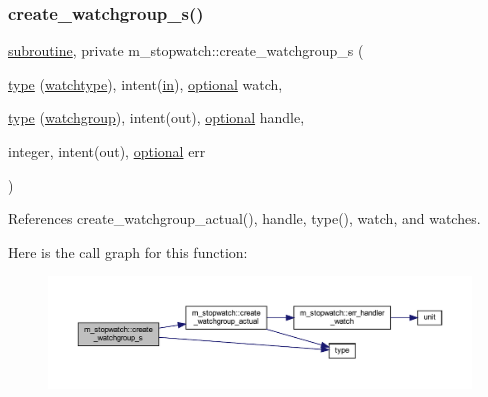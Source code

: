 \subsubsection{\texorpdfstring{create\+\_\+watchgroup\+\_\+s()}{create\_watchgroup\_s()}}
{\footnotesize\ttfamily \hyperlink{M__stopwatch_83_8txt_acfbcff50169d691ff02d4a123ed70482}{subroutine}, private m\+\_\+stopwatch\+::create\+\_\+watchgroup\+\_\+s (\begin{DoxyParamCaption}\item[{\hyperlink{stop__watch_83_8txt_a70f0ead91c32e25323c03265aa302c1c}{type} (\hyperlink{structm__stopwatch_1_1watchtype}{watchtype}), intent(\hyperlink{M__journal_83_8txt_afce72651d1eed785a2132bee863b2f38}{in}), \hyperlink{option__stopwatch_83_8txt_aa4ece75e7acf58a4843f70fe18c3ade5}{optional}}]{watch,  }\item[{\hyperlink{stop__watch_83_8txt_a70f0ead91c32e25323c03265aa302c1c}{type} (\hyperlink{structm__stopwatch_1_1watchgroup}{watchgroup}), intent(out), \hyperlink{option__stopwatch_83_8txt_aa4ece75e7acf58a4843f70fe18c3ade5}{optional}}]{handle,  }\item[{integer, intent(out), \hyperlink{option__stopwatch_83_8txt_aa4ece75e7acf58a4843f70fe18c3ade5}{optional}}]{err }\end{DoxyParamCaption})\hspace{0.3cm}{\ttfamily [private]}}



References create\+\_\+watchgroup\+\_\+actual(), handle, type(), watch, and watches.

Here is the call graph for this function\+:
\nopagebreak
\begin{figure}[H]
\begin{center}
\leavevmode
\includegraphics[width=350pt]{namespacem__stopwatch_a703105817c40afaacbda440167c539f4_cgraph}
\end{center}
\end{figure}
\mbox{\label{namespacem__stopwatch_a797f3a482e663407c89b981f41d7349b}} 
